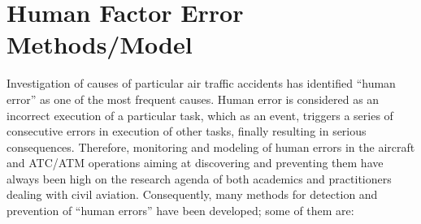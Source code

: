 \documentclass[a4paper, 10pt]{article}
\begin{document}
\section{Human Factor Error Methods/Model}

Investigation of causes of particular air traffic accidents has
identified “human error” as one of the most frequent causes. Human error is considered as an incorrect execution of a
particular task, which as an event, triggers a series of
consecutive errors in execution of other tasks, finally resulting
in serious consequences. Therefore, monitoring and modeling of human errors in the
aircraft and ATC/ATM operations aiming at discovering and
preventing them have always been high on the research agenda
of both academics and practitioners dealing with civil aviation.
Consequently, many methods for detection and prevention of
				“human errors” have been developed; some of them are:
\end{document}
